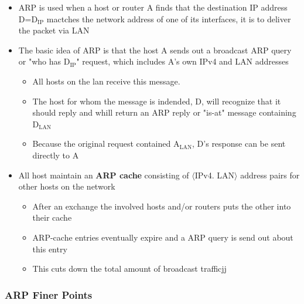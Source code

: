 \documentclass[11pt]{article}
\providecommand{\tightlist}{%
      \setlength{\itemsep}{0pt}\setlength{\parskip}{0pt}}
\begin{document}
\begin{itemize}
\tightlist
\item
  ARP is used when a host or router A finds that the destination IP
  address D=D\(_\text{IP}\) mactches the network address of one of its
  interfaces, it is to deliver the packet via LAN
\item
  The basic idea of ARP is that the host A sends out a broadcast ARP
  query or "who has D\(_\text{IP}\)" request, which includes A's own
  IPv4 and LAN addresses

  \begin{itemize}
  \tightlist
  \item
    All hosts on the lan receive this message.
  \item
    The host for whom the message is indended, D, will recognize that it
    should reply and whill return an ARP reply or "is-at" message
    containing D\(_\text{LAN}\)
  \item
    Because the original request contained A\(_\text{LAN}\), D's
    response can be sent directly to A
  \end{itemize}
\item
  All host maintain an \textbf{ARP cache} consisting of \(\langle\)IPv4.
  LAN\(\rangle\) address pairs for other hosts on the network

  \begin{itemize}
  \tightlist
  \item
    After an exchange the involved hosts and/or routers puts the other
    into their cache
  \item
    ARP-cache entries eventually expire and a ARP query is send out
    about this entry
  \item
    This cuts down the total amount of broadcast trafficjj
  \end{itemize}
\end{itemize}

    \subsubsection{ARP Finer Points}\label{arp-finer-points}
\end{document}
